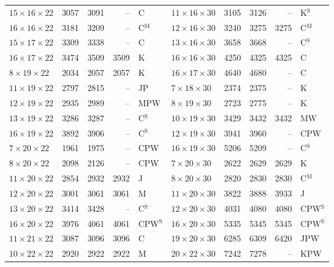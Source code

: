 \begin{longtable}{@{}lrrrl@{\hspace{6mm}}lrrrl@{}}
$15{\times}16{\times}22$ & 3057 & 3091 & -- & C & $11{\times}16{\times}30$ & 3105 & 3126 & -- & K$^{\mathrm{S}}$\\
$16{\times}16{\times}22$ & 3181 & 3209 & -- & C$^{\mathrm{M}}$ & $12{\times}16{\times}30$ & 3240 & 3275 & 3275 & C$^{\mathrm{M}}$\\
$15{\times}17{\times}22$ & 3309 & 3338 & -- & C & $13{\times}16{\times}30$ & 3658 & 3668 & -- & C$^{\mathrm{S}}$\\
$16{\times}17{\times}22$ & 3474 & 3509 & 3509 & K & $16{\times}16{\times}30$ & 4250 & 4325 & 4325 & C\\
$8{\times}19{\times}22$ & 2034 & 2057 & 2057 & K & $16{\times}17{\times}30$ & 4640 & 4680 & -- & C\\
$11{\times}19{\times}22$ & 2797 & 2815 & -- & JP & $7{\times}18{\times}30$ & 2374 & 2375 & -- & K\\
$12{\times}19{\times}22$ & 2935 & 2989 & -- & MPW & $8{\times}19{\times}30$ & 2723 & 2775 & -- & K\\
$13{\times}19{\times}22$ & 3286 & 3287 & -- & C$^{\mathrm{S}}$ & $10{\times}19{\times}30$ & 3429 & 3432 & 3432 & MW\\
$16{\times}19{\times}22$ & 3892 & 3906 & -- & C$^{\mathrm{S}}$ & $12{\times}19{\times}30$ & 3941 & 3960 & -- & CPW\\
$7{\times}20{\times}22$ & 1961 & 1975 & -- & CPW & $16{\times}19{\times}30$ & 5206 & 5209 & -- & C$^{\mathrm{S}}$\\
$8{\times}20{\times}22$ & 2098 & 2126 & -- & CPW & $7{\times}20{\times}30$ & 2622 & 2629 & 2629 & K\\
$11{\times}20{\times}22$ & 2854 & 2932 & 2932 & J & $8{\times}20{\times}30$ & 2820 & 2830 & 2830 & C$^{\mathrm{M}}$\\
$12{\times}20{\times}22$ & 3001 & 3061 & 3061 & M & $11{\times}20{\times}30$ & 3822 & 3888 & 3933 & J\\
$13{\times}20{\times}22$ & 3414 & 3428 & -- & C$^{\mathrm{S}}$ & $12{\times}20{\times}30$ & 4031 & 4080 & 4080 & CPW$^{\mathrm{S}}$\\
$16{\times}20{\times}22$ & 3976 & 4061 & 4061 & CPW$^{\mathrm{S}}$ & $16{\times}20{\times}30$ & 5335 & 5345 & 5345 & CPW$^{\mathrm{S}}$\\
$11{\times}21{\times}22$ & 3087 & 3096 & 3096 & C & $19{\times}20{\times}30$ & 6285 & 6309 & 6420 & JPW\\
$10{\times}22{\times}22$ & 2920 & 2922 & 2922 & M & $20{\times}22{\times}30$ & 7242 & 7278 & -- & KPW\\

\end{longtable}
